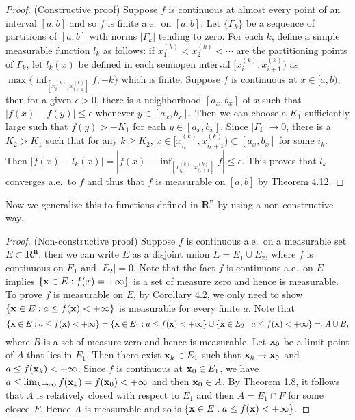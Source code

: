 \begin{proof} (Constructive proof) Suppose $f$ is continuous at almost every point of an interval $[a,b]$ and so $f$ is finite a.e.\ on $[a,b]$.
Let $\{\Gamma_k\}$ be a sequence of partitions of $[a,b]$ with norms $|\Gamma_k|$ tending to zero.
For each $k$, define a simple measurable function $l_k$ as follows:
if $x_1^{(k)}<x_2^{(k)}<\cdots$ are the partitioning points of $\Gamma_k$,
let $l_k(x)$ be defined in each semiopen interval $[x_i^{(k)},x_{i+1}^{(k)})$ as
$\max\{\inf_{[x_i^{(k)},x_{i+1}^{(k)}]}f,-k\}$ which is finite.
Suppose $f$ is continuous at $x\in[a,b)$, then for a given $\epsilon>0$,
there is a neighborhood $[a_x,b_x]$ of $x$ such that $|f(x)-f(y)|\leq \epsilon$
whenever $y\in [a_x,b_x]$.
Then we can choose a $K_1$ sufficiently large such that $f(y)> -K_1$ for each $y\in [a_x,b_x]$.
Since $|\Gamma_k|\to 0$, there is a $K_2>K_1$ such that for any $k\geq K_2$,
$x\in [x_{i_k}^{(k)},x_{{i_k}+1}^{(k)})\subset [a_x,b_x]$ for some $i_k$.
Then $|f(x)-l_k(x)|=|f(x)-\inf_{[x_{i_k}^{(k)},x_{i_{k}+1}^{(k)}]}f|\leq\epsilon$.
This proves that $l_k$ converges a.e.\ to $f$ and
thus that $f$ is measurable on $[a,b]$ by Theorem 4.12.
\end{proof}

Now we generalize this to functions defined in $\mathbf{R^n}$ by using a non-constructive way.

\begin{proof}(Non-constructive proof)
  Suppose $f$ is continuous a.e.\ on a measurable set $E\subset \mathbf{R^n}$,
  then we can write $E$ as a disjoint union $E=E_1\cup E_2$,
  where $f$ is continuous on $E_1$ and $|E_2|=0$.
  Note that the fact $f$ is continuous a.e.\ on $E$ implies
  $\{\mathbf{x}\in E:f(x)=+\infty\}$ is a set of measure zero and hence is measurable.
  To prove $f$ is measurable on $E$, by Corollary 4.2,
  we only need to show $\{\mathbf{x}\in E: a\leq f(\mathbf{x})<+\infty\}$ is measurable for every finite $a$.
  Note that \[\{\mathbf{x}\in E: a\leq f(\mathbf{x})<+\infty\}=\{\mathbf{x}\in E_1: a\leq f(\mathbf{x})<+\infty\}\cup\{\mathbf{x}\in E_2: a\leq f(\mathbf{x})<+\infty\}\eqqcolon A\cup B,\]
  where $B$ is a set of measure zero and hence is measurable.
  Let $\mathbf{x}_0$ be a limit point of $A$ that lies in $E_1$.
  Then there exist $\mathbf{x}_k\in E_1$ such that $\mathbf{x}_k\to \mathbf{x}_0$ and $a\leq f(\mathbf{x}_k)<+\infty$.
  Since $f$ is continuous at $\mathbf{x}_0\in E_1$,
  we have $a\leq \lim_{k\to\infty}f(\mathbf{x}_k)=f(\mathbf{x}_0)<+\infty$
  and then $\mathbf{x}_0\in A$.
  By Theorem 1.8, it follows that $A$ is relatively closed with respect to $E_1$ and then $A=E_1\cap F$ for some closed $F$.
  Hence $A$ is measurable and so is $\{\mathbf{x}\in E: a\leq f(\mathbf{x})<+\infty\}$.
\end{proof}

